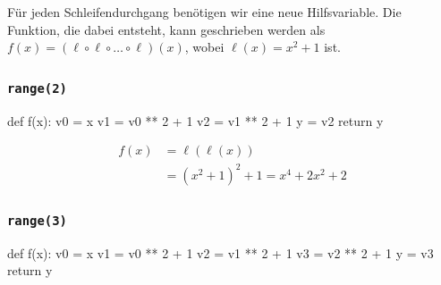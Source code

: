 \documentclass[
  letterpaper,
  DIV=11,
  oneside]{scrreprt}
\newenvironment{Shaded}{\begin{snugshade}}{\end{snugshade}}
\newcommand{\ControlFlowTok}[1]{\textcolor[rgb]{0.00,0.23,0.31}{#1}}
\newcommand{\DecValTok}[1]{\textcolor[rgb]{0.68,0.00,0.00}{#1}}
\newcommand{\KeywordTok}[1]{\textcolor[rgb]{0.00,0.23,0.31}{#1}}
\newcommand{\NormalTok}[1]{\textcolor[rgb]{0.00,0.23,0.31}{#1}}
\newcommand{\OperatorTok}[1]{\textcolor[rgb]{0.37,0.37,0.37}{#1}}
\theoremstyle{definition}
\theoremstyle{definition}
\theoremstyle{remark}
\begin{document}
\begin{tcolorbox}[enhanced jigsaw, colframe=quarto-callout-tip-color-frame, colback=white, opacityback=0, toptitle=1mm, bottomrule=.15mm, breakable, title=\textcolor{quarto-callout-tip-color}{\faLightbulb}\hspace{0.5em}{Lösung}, toprule=.15mm, colbacktitle=quarto-callout-tip-color!10!white, leftrule=.75mm, titlerule=0mm, coltitle=black, bottomtitle=1mm, arc=.35mm, rightrule=.15mm, left=2mm, opacitybacktitle=0.6]

Für jeden Schleifendurchgang benötigen wir eine neue Hilfsvariable. Die
Funktion, die dabei entsteht, kann geschrieben werden als
\(f(x) = (\ell \circ \ell \circ \ldots \circ \ell)(x)\), wobei
\(\ell(x) = x^2 + 1\) ist.

\hypertarget{range2}{%
\subsubsection{\texorpdfstring{\texttt{range(2)}}{range(2)}}\label{range2}}

\begin{Shaded}
\begin{Highlighting}[]
\KeywordTok{def}\NormalTok{ f(x):}
\NormalTok{    v0 }\OperatorTok{=}\NormalTok{ x}
\NormalTok{    v1 }\OperatorTok{=}\NormalTok{ v0 }\OperatorTok{**} \DecValTok{2} \OperatorTok{+} \DecValTok{1}
\NormalTok{    v2 }\OperatorTok{=}\NormalTok{ v1 }\OperatorTok{**} \DecValTok{2} \OperatorTok{+} \DecValTok{1}
\NormalTok{    y }\OperatorTok{=}\NormalTok{ v2}
    \ControlFlowTok{return}\NormalTok{ y}
\end{Highlighting}
\end{Shaded}

\[
\begin{flalign}
    f(x) &= \ell(\ell(x)) \\ 
         &= (x^2 + 1)^2 + 1 = x^4 + 2x^2 + 2
\end{flalign}
\]

\hypertarget{range3}{%
\subsubsection{\texorpdfstring{\texttt{range(3)}}{range(3)}}\label{range3}}

\begin{Shaded}
\begin{Highlighting}[]
\KeywordTok{def}\NormalTok{ f(x):}
\NormalTok{    v0 }\OperatorTok{=}\NormalTok{ x}
\NormalTok{    v1 }\OperatorTok{=}\NormalTok{ v0 }\OperatorTok{**} \DecValTok{2} \OperatorTok{+} \DecValTok{1}
\NormalTok{    v2 }\OperatorTok{=}\NormalTok{ v1 }\OperatorTok{**} \DecValTok{2} \OperatorTok{+} \DecValTok{1}
\NormalTok{    v3 }\OperatorTok{=}\NormalTok{ v2 }\OperatorTok{**} \DecValTok{2} \OperatorTok{+} \DecValTok{1}
\NormalTok{    y }\OperatorTok{=}\NormalTok{ v3}
    \ControlFlowTok{return}\NormalTok{ y}
\end{Highlighting}
\end{Shaded}


\end{tcolorbox}
\end{document}
